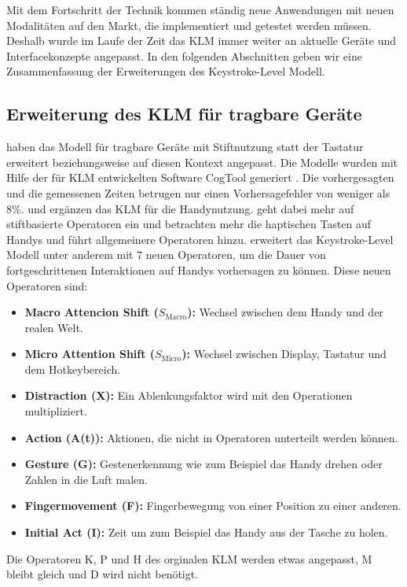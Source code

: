Mit dem Fortschritt der Technik kommen ständig neue Anwendungen mit neuen Modalitäten auf den Markt, die implementiert und getestet werden müssen. 
Deshalb wurde im Laufe der Zeit das KLM immer weiter an aktuelle Geräte und Interfacekonzepte angepasst. 
In den folgenden Abschnitten geben wir eine Zusammenfassung der Erweiterungen des Keystroke-Level Modell.
\subsection[KLM für tragbare Geräte]{Erweiterung des KLM für tragbare Geräte}
\citet{Luo_2005} haben das Modell für tragbare Geräte mit Stiftnutzung statt der Tastatur erweitert beziehungsweise auf diesen Kontext angepasst. 
Die Modelle wurden mit Hilfe der für KLM entwickelten Software CogTool generiert \citep{John_2004}. 
Die vorhergesagten und die gemessenen Zeiten betrugen nur einen Vorhersagefehler von weniger als 8\%.
\citep{Holleis_2007} und \citep{Li_2010} ergänzen das KLM für die Handynutzung. 
\citeauthor{Li_2010} geht dabei mehr auf stiftbasierte Operatoren ein und \citet{Holleis_2007} betrachten mehr die haptischen Tasten auf Handys und führt allgemeinere Operatoren hinzu. 
\citet{Holleis_2007} erweitert das Keystroke-Level Modell unter anderem mit 7 neuen Operatoren, um die Dauer von  fortgeschrittenen Interaktionen auf Handys vorhersagen zu können. 
Diese neuen Operatoren sind:
\begin{itemize}
	\item \textbf{Macro Attencion Shift ($S_\text{Macro}$):} Wechsel zwischen dem Handy und der realen Welt.
	\item \textbf{Micro Attention Shift ($S_\text{Micro}$):} Wechsel zwischen Display, Tastatur und dem Hotkeybereich.
	\item \textbf{Distraction (X):} Ein Ablenkungsfaktor wird mit den Operationen multipliziert.
	\item \textbf{Action (A(t)):} Aktionen, die nicht in Operatoren unterteilt werden können.
	\item \textbf{Gesture (G):} Gestenerkennung wie zum Beispiel das Handy drehen oder Zahlen in die Luft malen.
	\item \textbf{Fingermovement (F):} Fingerbewegung von einer Position zu einer anderen.
	\item \textbf{Initial Act (I):} Zeit um zum Beispiel das Handy aus der Tasche zu holen.
\end{itemize}
Die Operatoren K, P und H des orginalen KLM werden etwas angepasst, M bleibt gleich und D wird nicht benötigt.
 
